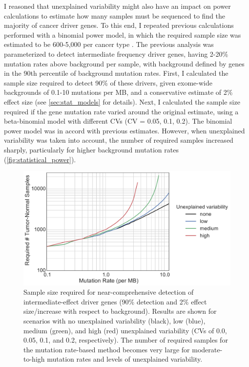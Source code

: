I reasoned that unexplained variability might also have an impact on power calculations to estimate how many samples must be sequenced to find the majority of cancer driver genes. To this end, I repeated previous calculations performed with a binomial power model, in which the required sample size was estimated to be 600-5,000 per cancer type \cite{RN14}. The previous analysis was parameterized to detect intermediate frequency driver genes, having 2-20\% mutation rates above background per sample, with background defined by genes in the 90th percentile of background mutation rates. First, I calculated the sample size required to detect 90\% of these drivers, given exome-wide backgrounds of 0.1-10 mutations per MB, and a conservative estimate of 2\% effect size (see \autoref{sec:stat_models} for details). Next, I calculated the sample size required if the gene mutation rate varied around the original estimate, using a beta-binomial model with different CVs (CV = 0.05, 0.1, 0.2). The binomial power model was in accord with previous estimates. However, when unexplained variability was taken into account, the number of required samples increased sharply, particularly for higher background mutation rates (\autoref{fig:statistical_power}).

\begin{figure}
  \centering
  \makeatletter
  \let\@currsize\normalsize
  \includegraphics[width=0.9\linewidth]{figures/chapter2/statistical_power.pdf}
  \caption[Sample size required for near-comprehensive detection of driver genes]{Sample size required for near-comprehensive detection of intermediate-effect driver genes (90\% detection and 2\% effect size/increase with respect to background). Results are shown for scenarios with no unexplained variability (black), low (blue), medium (green), and high (red) unexplained variability (CVs of 0.0, 0.05, 0.1, and 0.2, respectively). The number of required samples for the mutation rate-based method becomes very large for moderate-to-high mutation rates and levels of unexplained variability.}
  \label{fig:statistical_power}
\end{figure}

